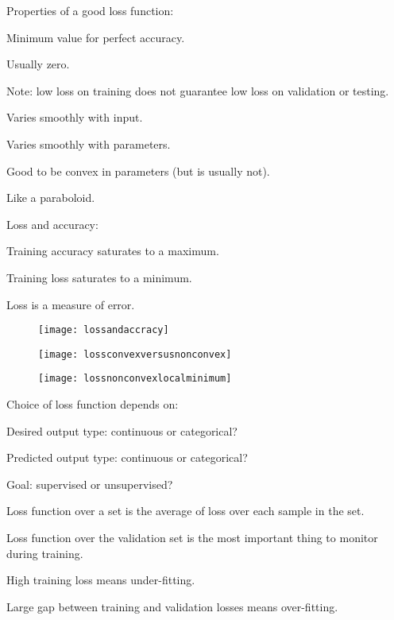 Properties of a good loss function:
	\begin{bulletedlist}
		\item Minimum value for perfect accuracy.
		\begin{bulletedlist}
			\item Usually zero.
			\item Note: low loss on training does not guarantee low loss on validation or testing.
		\end{bulletedlist}
		\item Varies smoothly with input.
		\item Varies smoothly with parameters.
		\item Good to be convex in parameters (but is usually not).
		\begin{bulletedlist}
			\item Like a paraboloid.
		\end{bulletedlist}
	\end{bulletedlist}

Loss and accuracy:
	\begin{bulletedlist}
		\item Training accuracy saturates to a maximum.
		\item Training loss saturates to a minimum.
		\item Loss is a measure of error.
	\end{bulletedlist}
 	\begin{figure}[h]
		\centering
		\texttt{[image: lossandaccracy]}
		\caption{}
		\label{fig:lossandaccracy}
	\end{figure}
 	\begin{figure}[h]
		\centering
		\texttt{[image: lossconvexversusnonconvex]}
		\caption{}
		\label{fig:lossconvexversusnonconvex}
	\end{figure}
 	\begin{figure}[h]
		\centering
		\texttt{[image: lossnonconvexlocalminimum]}
		\caption{}
		\label{fig:lossnonconvexlocalminimum}
	\end{figure}



Choice of loss function depends on:
	\begin{bulletedlist}
		\item Desired output type: continuous or categorical?
		\item Predicted output type: continuous or categorical?
		\item Goal: supervised or unsupervised?
		\item Loss function over a set is the average of loss over each sample in the set.
		\item Loss function over the validation set is the most important thing to monitor during training.
		\item High training loss means under-fitting.
		\item Large gap between training and validation losses means over-fitting.
	\end{bulletedlist}

